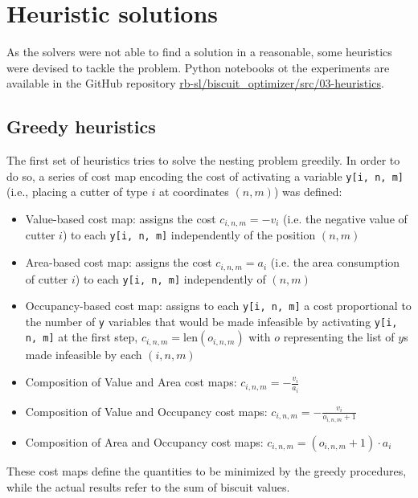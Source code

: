 
\section{Heuristic solutions}
As the solvers were not able to find a solution in a reasonable, some heuristics were devised to tackle the problem. Python notebooks ot the experiments are available in the GitHub repository  \href{https://github.com/rb-sl/biscuit_optimizer/tree/main/src/03-heuristics}{rb-sl/biscuit\_optimizer/src/03-heuristics}.

\subsection{Greedy heuristics}\label{sec:greedy}
The first set of heuristics tries to solve the nesting problem greedily. In order to do so, a series of cost map encoding the cost of activating a variable \texttt{y[i, n, m]} (i.e., placing a cutter of type $i$ at coordinates $(n, m)$) was defined:
\begin{itemize}[itemsep=-1mm, topsep=0mm]
	\item Value-based cost map: assigns the cost $c_{i,n,m} = -v_i$ (i.e. the negative value of cutter $i$) to each \texttt{y[i, n, m]} independently of the position $(n, m)$
	\item Area-based cost map: assigns the cost $c_{i,n,m} = a_i$ (i.e. the area consumption of cutter $i$) to each \texttt{y[i, n, m]} independently of $(n, m)$
	\item Occupancy-based cost map: assigns to each \texttt{y[i, n, m]} a cost proportional to the number of \texttt{y} variables that would be made infeasible by activating \texttt{y[i, n, m]} at the first step, $c_{i, n, m} = \textrm{len}(o_{i, n, m})$ with $o$ representing the list of $y$s made infeasible by each $(i, n, m)$
	\item Composition of Value and Area cost maps: $c_{i, n, m} = -\frac{v_i}{a_i}$
	\item Composition of Value and Occupancy cost maps: $c_{i, n, m} = -\frac{v_i}{o_{i, n, m} + 1}$
	\item Composition of Area and Occupancy cost maps: $c_{i, n, m} = (o_{i, n, m} + 1) \cdot a_i$
\end{itemize}
These cost maps define the quantities to be minimized by the greedy procedures, while the actual results refer to the sum of biscuit values. 

